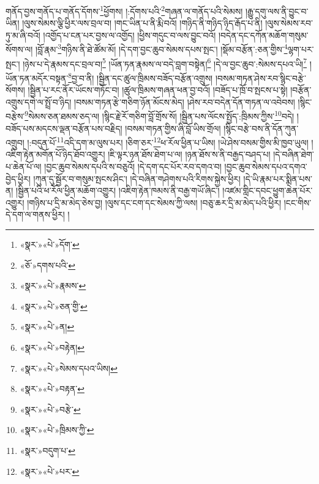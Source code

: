 \documentclass[12pt,a4paper]{book}
\begin{document}
གནོད་བྱས་གནོད་པ་གནོད་དོགས་\footnote{«སྣར་»«པེ་»དོག་}ཕྱོགས། །:དོགས་པའི་\footnote{«ཅོ་»དགས་པའི་}གཞན་ལ་གནོད་པའི་སེམས། །རྒྱུ་དགུ་ལས་ནི་བྱུང་བ་ཡིན། །ལུས་སེམས་ལྕི་ཕྱིར་ལས་བྲལ་བ། །གང་ཡིན་པ་ནི་རྨི་བའོ། །གཉིད་ནི་གཉིད་ཉིད་རྒོད་པ་ནི། །ལུས་སེམས་རབ་ཏུ་མ་ཞི་བའོ། །འགྱོད་པ་ངན་པར་བྱས་ལ་འགྱོད། །ཕྱིས་གདུང་བ་ལས་བྱུང་བའོ། །བདེན་དང་དཀོན་མཆོག་གསུམ་སོགས་ལ། །བློ་རྣམ་\footnote{«སྣར་»«པེ་»རྣམས་}གཉིས་ནི་ཐེ་ཚོམ་མོ། །དེ་དག་བྱང་ཆུབ་སེམས་དཔས་སྤང་། །སྡོམ་བརྩོན་:ཅན་གྱིས་\footnote{«སྣར་»«པེ་»ཅན་གྱི་}ལྷག་པར་སྤང་། །ཉེས་པ་དེ་རྣམས་དང་བྲལ་བ།\footnote{«སྣར་»«པེ་»ན།} །ཡོན་ཏན་རྣམས་ལ་བདེ་བླག་བསྟེན།\footnote{«སྣར་»«པེ་»བརྟེན།} །དེ་ལ་བྱང་ཆུབ་:སེམས་དཔའ་ཡི།\footnote{«སྣར་»«པེ་»སེམས་དཔའ་ཡིས།} །ཡོན་ཏན་མདོར་བསྟན་\footnote{«སྣར་»«པེ་»བརྟན་}བྱ་བ་ནི། །སྦྱིན་དང་ཚུལ་ཁྲིམས་བཟོད་བརྩོན་འགྲུས། །བསམ་གཏན་ཤེས་རབ་སྙིང་བརྩེ་སོགས། །སྦྱིན་པ་རང་ནོར་ཡོངས་གཏོང་བ། །ཚུལ་ཁྲིམས་གཞན་ཕན་བྱ་བའོ། །བཟོད་པ་ཁྲོ་བ་སྤངས་པ་སྟེ། །བརྩོན་འགྲུས་དགེ་ལ་སྤྲོ་བ་ཉིད། །བསམ་གཏན་རྩེ་གཅིག་ཉོན་མོངས་མེད། །ཤེས་རབ་བདེན་དོན་གཏན་ལ་འབེབས། །སྙིང་བརྩེས་\footnote{«སྣར་»«པེ་»བརྩེ་}སེམས་ཅན་ཐམས་ཅད་ལ། །སྙིང་རྗེ་རོ་གཅིག་བློ་གྲོས་སོ། །སྦྱིན་པས་ལོངས་སྤྱོད་:ཁྲིམས་ཀྱིས་\footnote{«སྣར་»«པེ་»ཁྲིམས་ཀྱི་}བདེ། །བཟོད་པས་མདངས་ལྡན་བརྩོན་པས་བརྗིད། །བསམ་གཏན་གྱིས་ཞི་བློ་ཡིས་གྲོལ། །སྙིང་བརྩེ་བས་ནི་དོན་ཀུན་འགྲུབ། །:བདུན་པོ་\footnote{«སྣར་»བདུག་པ་}འདི་དག་མ་ལུས་པར། །ཅིག་ཅར་\footnote{«སྣར་»«པེ་»པར་}ཕ་རོལ་ཕྱིན་པ་ཡིས། །ཡེ་ཤེས་བསམ་གྱིས་མི་ཁྱབ་ཡུལ། །འཇིག་རྟེན་མགོན་པོ་ཉིད་ཐོབ་འགྱུར། །ཇི་ལྟར་ཉན་ཐོས་ཐེག་པ་ལ། །ཉན་ཐོས་ས་ནི་བརྒྱད་བཤད་པ། །དེ་བཞིན་ཐེག་པ་ཆེན་པོ་ལ། །བྱང་ཆུབ་སེམས་དཔའི་ས་བཅུའོ། །དེ་དག་དང་པོར་རབ་དགའ་བ། །བྱང་ཆུབ་སེམས་དཔའ་དགའ་བྱེད་ཕྱིར། །ཀུན་དུ་སྦྱོར་བ་གསུམ་སྤངས་ཤིང་། །དེ་བཞིན་གཤེགས་པའི་རིགས་སྐྱེས་ཕྱིར། །དེ་ཡི་རྣམ་པར་སྨིན་པས་ན། །སྦྱིན་པའི་ཕ་རོལ་ཕྱིན་མཆོག་འགྱུར། །འཇིག་རྟེན་ཁམས་ནི་བརྒྱ་གཡོ་ཞིང་། །འཛམ་གླིང་དབང་ཕྱུག་ཆེན་པོར་འགྱུར། །གཉིས་པ་དྲི་མ་མེད་ཅེས་བྱ། །ལུས་དང་ངག་དང་སེམས་ཀྱི་ལས། །བཅུ་ཆར་དྲི་མ་མེད་པའི་ཕྱིར། །ངང་གིས་དེ་དག་ལ་གནས་ཕྱིར། །
\end{document}
